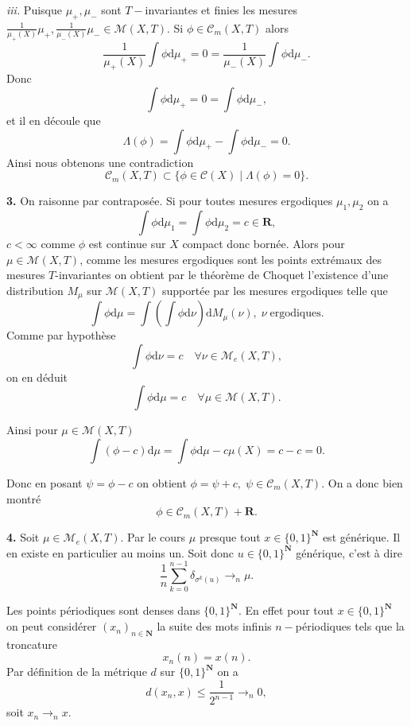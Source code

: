 \documentclass[12pt]{article}
\newcommand{\R}{\mathbf{R}}
\newcommand{\N}{\mathbf{N}}
\newcommand{\de}{\mathrm{d}}
\begin{document}
\medskip

\textit{iii.} Puisque $\mu_{+}, \mu_{-}$ sont $T-$invariantes et finies les mesures $\frac{1}{\mu_{+}(X)}\mu_{+}, \frac{1}{\mu_{-}(X)}\mu_{-} \in \mathcal{M}(X,T)$. Si $\phi \in \mathcal{C}_{m}(X,T)$ alors \[
        \frac{1}{\mu_{+}(X)}\int\phi\de\mu_{+} = 0 = \frac{1}{\mu_{-}(X)}\int\phi\de\mu_{-}
.\] Donc \[
\int\phi\de\mu_{+} = 0 = \int\phi\de\mu_{-}
,\] et il en découle que \[
\Lambda(\phi) = \int\phi\de\mu_{+} - \int\phi\de\mu_{-} = 0
.\]  
Ainsi nous obtenons une contradiction \[
        \mathcal{C}_{m}(X,T) \subset \{\phi \in \mathcal{C}(X) \;|\; \Lambda(\phi) = 0\} 
.\] 

\bigskip

\textbf{3.} On raisonne par contraposée. Si pour toutes mesures ergodiques $\mu_1, \mu_2$ on a \[
        \int\phi\de\mu_1 = \int\phi\de\mu_2 = c \in \R
,\] $c < \infty$ comme $\phi$ est continue sur $X$ compact donc bornée. Alors pour $\mu \in \mathcal{M}(X,T)$, comme les mesures ergodiques sont les points extrémaux des mesures  $T$-invariantes on obtient par le théorème de Choquet l'existence d'une distribution $M_{\mu}$ sur $\mathcal{M}(X,T)$ supportée par les mesures ergodiques telle que \[
\int\phi\de\mu = \int(\int\phi\de\nu)\de M_{\mu}(\nu), \; \nu \; \text{ergodiques}
.\]  
Comme par hypothèse  \[
        \int\phi\de\nu = c \quad \forall \nu \in \mathcal{M}_{e}(X,T)
,\] on en déduit \[
\int\phi\de\mu = c \quad \forall \mu \in \mathcal{M}(X,T)
.\] 

Ainsi pour $\mu \in \mathcal{M}(X,T)$ \[
        \int(\phi - c)\de\mu = \int\phi\de\mu - c\mu(X) = c - c = 0
.\] 

Donc en posant $\psi = \phi - c$ on obtient $\phi = \psi + c, \; \psi \in \mathcal{C}_{m}(X,T)$. On a donc bien montré \[
        \phi \in \mathcal{C}_{m}(X,T) + \R
.\]  

\bigskip

\textbf{4.} Soit $\mu \in \mathcal{M}_{e}(X,T)$. Par le cours $\mu$ presque tout  $x \in \{0,1\}^{\N}$ est générique. Il en existe en particulier au moins un. Soit donc $u \in \{0,1\}^{\N}$ générique, c'est à dire \[
        \frac{1}{n}\sum_{k=0}^{n-1}\delta_{\sigma^{k}(u)} \to_{n} \mu
.\]  

Les points périodiques sont denses dans $\{0,1\}^{\N}$. En effet pour tout $x \in \{0,1\}^{\N}$ on peut considérer $(x_{n})_{n\in\N}$ la suite des mots infinis $n-$périodiques tels que la troncature \[
        x_{n}(n) = x(n)
.\] Par définition de la métrique $d$ sur $\{0,1\}^{\N}$ on a \[
d(x_{n}, x) \le \frac{1}{2^{n-1}} \to_{n} 0
,\] soit $x_{n} \to_{n} x$.
\end{document}
